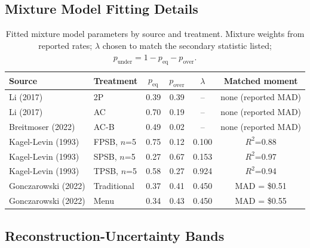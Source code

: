 \documentclass[acmsmall,screen,review]{acmart}
\newcommand{\rev}[1]{{\color{blue}#1}}
\newcommand{\rev}[1]{#1}
\begin{document}
\subsection{Mixture Model Fitting Details}\label{app:mixture}

\begin{table}[h]
\centering
\small
\begin{tabular}{llcccc}
\toprule
Source & Treatment & $p_{\text{eq}}$ & $p_{\text{over}}$ & $\lambda$ & Matched moment \\
\midrule
Li (2017) & 2P & \rev{0.39} & \rev{0.39} & \rev{--} & \rev{none (reported MAD)} \\
Li (2017) & AC & \rev{0.70} & \rev{0.19} & \rev{--} & \rev{none (reported MAD)} \\
Breitmoser (2022) & \rev{AC-B} & \rev{0.49} & \rev{0.02} & \rev{--} & \rev{none (reported MAD)} \\
Kagel-Levin (1993) & FPSB, $n$=5 & 0.75 & 0.12 & 0.100 & $R^2$=0.88 \\
Kagel-Levin (1993) & SPSB, $n$=5 & 0.27 & 0.67 & 0.153 & $R^2$=0.97 \\
Kagel-Levin (1993) & TPSB, $n$=5 & 0.58 & 0.27 & 0.924 & $R^2$=0.94 \\
Gonczarowski (2022) & Traditional & 0.37 & 0.41 & 0.450 & MAD = \$0.51 \\
Gonczarowski (2022) & Menu & 0.34 & 0.43 & 0.450 & MAD = \$0.55 \\
\bottomrule
\end{tabular}
\caption{Fitted mixture model parameters by source and treatment. Mixture weights from reported rates; $\lambda$ chosen to match the secondary statistic listed; $p_{\text{under}} = 1 - p_{\text{eq}} -
p_{\text{over}}$.}
\label{tab:mixture_fit}
\end{table}

\subsection{\texorpdfstring{Reconstruction-Uncertainty Bands}{Reconstruction-Uncertainty Bands}}\label{app:bands}
\end{document}
